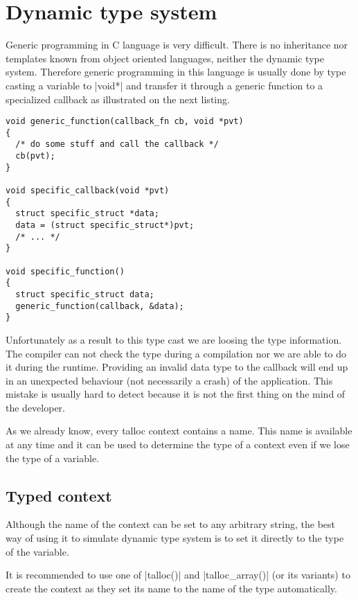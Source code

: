 \section{Dynamic type system}
\label{talloc:dyn-ts}

Generic programming in C language is very difficult. There is no inheritance nor
templates known from object oriented languages, neither the dynamic type system.
Therefore generic programming in this language is usually done by type casting a
variable to |void*| and transfer it through a generic function to a specialized
callback as illustrated on the next listing.

\begin{lstlisting}[caption={Generic programming pattern},label=lst-generic-prg]
void generic_function(callback_fn cb, void *pvt)
{
  /* do some stuff and call the callback */
  cb(pvt);
}

void specific_callback(void *pvt)
{
  struct specific_struct *data;
  data = (struct specific_struct*)pvt;
  /* ... */
}

void specific_function()
{
  struct specific_struct data;
  generic_function(callback, &data);
}
\end{lstlisting}

Unfortunately as a result to this type cast we are loosing the type information.
The compiler can not check the type during a compilation nor we are able to do
it during the runtime. Providing an invalid data type to the callback will end
up in an unexpected behaviour (not necessarily a crash) of the application.
This mistake is usually hard to detect because it is not the first thing on the
mind of the developer.

As we already know, every talloc context contains a name. This name is available
at any time and it can be used to determine the type of a context even if we
lose the type of a variable.

\subsection{Typed context}

Although the name of the context can be set to any arbitrary string, the best
way of using it to simulate dynamic type system is to set it directly to the
type of the variable.

It is recommended to use one of |talloc()| and |talloc_array()| (or its
variants) to create the context as they set its name to the name of the type
automatically.

